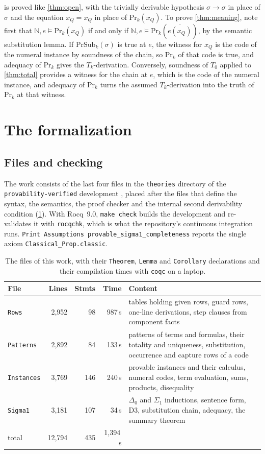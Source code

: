 \documentclass[11pt]{article}
\theoremstyle{plain}
\theoremstyle{definition}
\theoremstyle{remark}
\newcommand{\N}{\mathbb{N}}
\newcommand{\T}[1]{T_{#1}}
\newcommand{\Prv}{\mathrm{Pr}}
\newcommand{\num}[1]{\overline{#1}}
\newcommand{\PSub}{\mathrm{PrSub}}
\newcommand{\rocq}[1]{\texttt{#1}}
\newcommand{\sat}{\models}
\begin{document}
 is proved like \cref{thm:open}, with the trivially
derivable hypothesis $\sigma \to \sigma$ in place of $\sigma$ and the
equation $x_Q = x_Q$ in place of $\Prv_k(x_Q)$.  To prove
\cref{thm:meaning}, note first that
$\N, e \sat \Prv_k(x_Q)$ if and only if
$\N, e \sat \Prv_k(\num{e(x_Q)})$, by the semantic substitution lemma.
If $\PSub_k(\sigma)$ is true at $e$, the witness for $x_Q$ is the code of
the numeral instance by soundness of the chain, so $\Prv_k$ of that code
is true, and adequacy of $\Prv_k$ gives the $\T{k}$-derivation.
Conversely, soundness of $\T0$ applied to \cref{thm:total} provides a
witness for the chain at $e$, which is the code of the numeral instance,
and adequacy of $\Prv_k$ turns the assumed $\T{k}$-derivation into the
truth of $\Prv_k$ at that witness.

\section{The formalization}\label{sec:formal}

\subsection{Files and checking}

The work consists of the last four files in the \rocq{theories}
directory of the \rocq{provability-verified} development
\cite{ProvabilityVerified}, placed after the files that define the
syntax, the semantics, the proof checker and the internal second
derivability condition (\cref{tab:files}).  With Rocq~9.0,
\verb|make check| builds the development and re-validates it with
\verb|rocqchk|, which is what the repository's continuous integration
runs.  \verb|Print Assumptions provable_sigma1_completeness| reports the
single axiom \rocq{Classical\_Prop.classic}.

\begin{table}[t]
\centering
\begin{tabular}{@{}lrrrp{6.1cm}@{}}
\toprule
File & Lines & Stmts & Time & Content \\
\midrule
\rocq{Rows} & 2{,}952 & 98 & 987\,s & tables holding given rows, guard rows, one-line derivations, step clauses from component facts \\
\rocq{Patterns} & 2{,}892 & 84 & 133\,s & patterns of terms and formulas, their totality and uniqueness, substitution, occurrence and capture rows of a code \\
\rocq{Instances} & 3{,}769 & 146 & 240\,s & provable instances and their calculus, numeral codes, term evaluation, sums, products, disequality \\
\rocq{Sigma1} & 3{,}181 & 107 & 34\,s & $\Delta_0$ and $\Sigma_1$ inductions, sentence form, D3, substitution chain, adequacy, the summary theorem \\
\midrule
total & 12{,}794 & 435 & 1{,}394\,s & \\
\bottomrule
\end{tabular}
\caption{The files of this work, with their \texttt{Theorem}, \texttt{Lemma} and \texttt{Corollary} declarations and their compilation times with \texttt{coqc} on a laptop.}
\label{tab:files}
\end{table}
\end{document}
